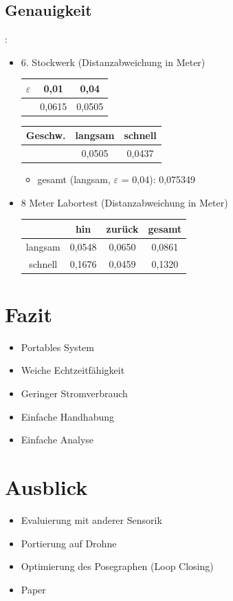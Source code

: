 \documentclass{beamer}
\begin{document}
\subsection{Genauigkeit}
\begin{frame}{\secname: \subsecname}
\begin{itemize}
\item{6. Stockwerk (Distanzabweichung in Meter)}
\begin{center}
\begin{tabular}{ccc}
\toprule
$\varepsilon$ & 0,01 & 0,04 \\ 
\midrule
& 0,0615 & 0,0505 \\  
\bottomrule
\end{tabular}
\end{center}
\begin{center}
\begin{tabular}{ccc}
\toprule
Geschw. & langsam & schnell \\ 
\midrule
& 0,0505 & 0,0437 \\  
\bottomrule
\end{tabular}
\end{center}
\begin{itemize}
\item{gesamt (langsam, $\varepsilon$ = 0,04): 0,075349}
\end{itemize}
\item{8 Meter Labortest (Distanzabweichung in Meter)}
\begin{center}
\begin{tabular}{cccc}
\toprule
& hin & zurück & gesamt \\ 
\midrule
langsam & 0,0548 & 0,0650 & 0,0861 \\  
schnell & 0,1676 & 0,0459 & 0,1320 \\
\bottomrule
\end{tabular}
\end{center}
\end{itemize}
\end{frame}

\section{Fazit}
\begin{frame}{\secname}
\begin{itemize}
\item{Portables System}
\item{Weiche Echtzeitfähigkeit}
\item{Geringer Stromverbrauch}
\item{Einfache Handhabung}
\item{Einfache Analyse}
\end{itemize}   
\end{frame}

\section{Ausblick}
\begin{frame}{\secname}
\begin{itemize}
\item Evaluierung mit anderer Sensorik
\item Portierung auf Drohne
\item Optimierung des Posegraphen (Loop Closing)
\item Paper
\end{itemize}
\end{frame}
\end{document}
